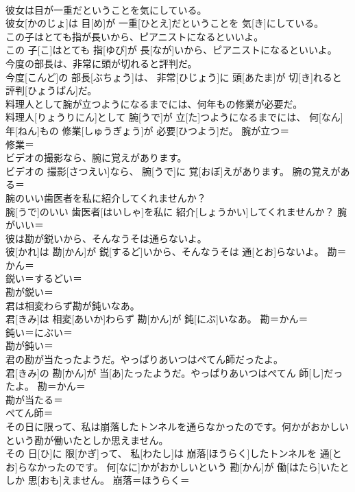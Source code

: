 \documentclass[8pt]{extreport}
\begin{document}
\begin{CJK}{UTF8}{min}
\\	彼女は目が一重だということを気にしている。	
\\	彼女[かのじょ]は 目[め]が 一重[ひとえ]だということを 気[き]にしている。	
\\	この子はとても指が長いから、ピアニストになるといいよ。	
\\	この 子[こ]はとても 指[ゆび]が 長[なが]いから、ピアニストになるといいよ。	
\\	今度の部長は、非常に頭が切れると評判だ。	
\\	今度[こんど]の 部長[ぶちょう]は、 非常[ひじょう]に 頭[あたま]が 切[き]れると 評判[ひょうばん]だ。	
\\	料理人として腕が立つようになるまでには、何年もの修業が必要だ。	
\\	料理人[りょうりにん]として 腕[うで]が 立[た]つようになるまでには、 何[なん] 年[ねん]もの 修業[しゅうぎょう]が 必要[ひつよう]だ。	腕が立つ＝ 
\\	修業＝ 
\\	ビデオの撮影なら、腕に覚えがあります。	
\\	ビデオの 撮影[さつえい]なら、 腕[うで]に 覚[おぼ]えがあります。	腕の覚えがある＝ 
\\	腕のいい歯医者を私に紹介してくれませんか？	
\\	腕[うで]のいい 歯医者[はいしゃ]を私に 紹介[しょうかい]してくれませんか？	腕がいい＝ 
\\	彼は勘が鋭いから、そんなうそは通らないよ。	
\\	彼[かれ]は 勘[かん]が 鋭[するど]いから、そんなうそは 通[とお]らないよ。	勘＝かん＝ 
\\	鋭い＝するどい＝ 
\\	勘が鋭い＝ 
\\	君は相変わらず勘が鈍いなあ。	
\\	君[きみ]は 相変[あいか]わらず 勘[かん]が 鈍[にぶ]いなあ。	勘＝かん＝ 
\\	鈍い＝にぶい＝ 
\\	勘が鈍い＝ 
\\	君の勘が当たったようだ。やっぱりあいつはぺてん師だったよ。	
\\	君[きみ]の 勘[かん]が 当[あ]たったようだ。やっぱりあいつはぺてん 師[し]だったよ。	勘＝かん＝ 
\\	勘が当たる＝ 
\\	ぺてん師＝ 
\\	その日に限って、私は崩落したトンネルを通らなかったのです。何かがおかしいという勘が働いたとしか思えません。	
\\	その 日[ひ]に 限[かぎ]って、 私[わたし]は 崩落[ほうらく]したトンネルを 通[とお]らなかったのです。 何[なに]かがおかしいという 勘[かん]が 働[はたら]いたとしか 思[おも]えません。	崩落＝ほうらく＝ 

\end{CJK}
\end{document}
